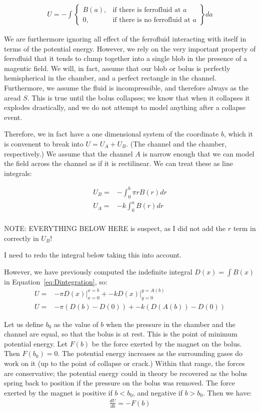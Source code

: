 \documentclass[]{asme2ej}
\begin{document}
\begin{align}
  U = -\int
\left\{
    \begin{array}{lr}
      B(a)  , & \text{if there is ferrofluid at } a \\
      0 , & \text{if there is no ferrofluid at } a
    \end{array}
\right\} da
\end{align}

We are furthermore ignoring all effect of the ferrofluid interacting with itself in terms
of the potential energy. However, we rely on the very important property of ferrofluid that
it tends to clump together into a single blob in the presence of a magentic field.
We will, in fact, assume that our blob or bolus is perfectly hemispherical in the chamber,
and a perfect rectangle in the channel. Furthermore, we assume the fluid is incompressible,
and therefore always as the aread $S$. This is true until the bolus collapses; we know that
when it collapses it explodes drastically, and we do not attempt to model anything after
a collapse event.

Therefore, we in fact have a one dimensional system of the coordinate $b$, which
it is convenent to break into $U = U_A + U_B$.
(The channel and the chamber, respectively.) We assume that the channel $A$ is narrow
enough that we can model the field across the channel as if it is rectilinear.
We can treat these as line integrals:

\begin{align}
  U_B = & - \int_0^b \pi r B(r) dr \\
  U_A = & -k\int_0^a B(r) dr\\
\end{align}

NOTE: EVERYTHING BELOW HERE is suspect, as I did not add the $r$ term in correctly in $U_B$!

I need to redo the integral below taking this into account.

However, we have previously computed the indefinite integral $D(x) = \int B(x)$ in Equation~\ref{eq:Dintegration},
so:
\begin{align}
  U = & -\pi D(x) \vert_{x=0}^{x=b}  + -k D(x)\vert_{y=0}^{y=A(b)} \\
  U = & -\pi (D(b) - D(0)) + -k (D(A(b)) - D(0))
  \label{eq:U}
\end{align}


Let us define $b_0$ as the value of $b$ when the pressure in the chamber and the channel are equal,
so that the bolus is at rest. This is the point of minimum potential energy.
Let $F(b)$ be the force exerted by the magnet on the bolus.
Then $F(b_0) = 0$.
The potential energy increases as the surrounding gases do work on it (up to the point of collapse
or crack.) Within that range, the forces are conservative; the potential energy could in theory
be recovered as the bolus spring back to position if the pressure on the bolus was removed.
The force exerted by the magnet is positive if $b < b_0$, and negative if $b > b_0$.
Then we have:
\begin{align}
  \frac{d U}{db} =  -F(b)
\end{align}
\end{document}
